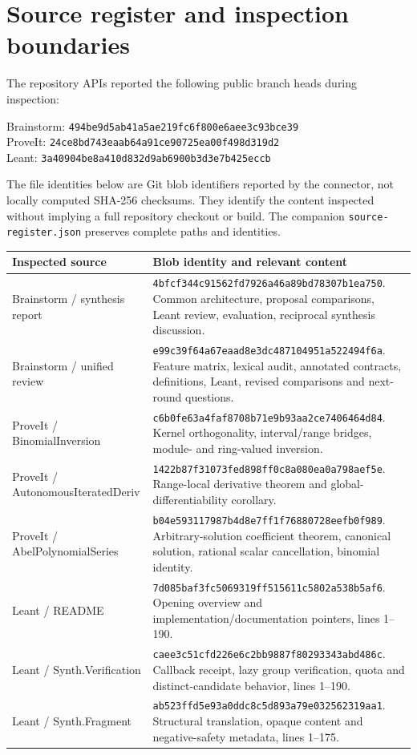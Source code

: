 \documentclass[11pt,a4paper]{article}
\newcommand{\code}[1]{\nolinkurl{#1}}
\theoremstyle{definition}
\begin{document}
\section{Source register and inspection boundaries}
\label{app:sources}
The repository APIs reported the following public branch heads during inspection:
\begin{flushleft}\small
Brainstorm: \code{494be9d5ab41a5ae219fc6f800e6aee3c93bce39}\\
ProveIt: \code{24ce8bd743eaab64a91ce90725ea00f498d319d2}\\
Leant: \code{3a40904be8a410d832d9ab6900b3d3e7b425eccb}
\end{flushleft}
The file identities below are Git blob identifiers reported by the connector,
not locally computed SHA-256 checksums. They identify the content inspected
without implying a full repository checkout or build. The companion
\code{source-register.json} preserves complete paths and identities.

\begin{longtable}{@{}P{.37\textwidth}P{.55\textwidth}@{}}
\toprule
Inspected source & Blob identity and relevant content \\
\midrule
\endhead
Brainstorm / synthesis report & \code{4bfcf344c91562fd7926a46a89bd78307b1ea750}. Common architecture, proposal comparisons, Leant review, evaluation, reciprocal synthesis discussion. \\
Brainstorm / unified review & \code{e99c39f64a67eaad8e3dc487104951a522494f6a}. Feature matrix, lexical audit, annotated contracts, definitions, Leant, revised comparisons and next-round questions. \\
ProveIt / BinomialInversion & \code{c6b0fe63a4faf8708b71e9b93aa2ce7406464d84}. Kernel orthogonality, interval/range bridges, module- and ring-valued inversion. \\
ProveIt / AutonomousIteratedDeriv & \code{1422b87f31073fed898ff0c8a080ea0a798aef5e}. Range-local derivative theorem and global-differentiability corollary. \\
ProveIt / AbelPolynomialSeries & \code{b04e593117987b4d8e7ff1f76880728eefb0f989}. Arbitrary-solution coefficient theorem, canonical solution, rational scalar cancellation, binomial identity. \\
Leant / README & \code{7d085baf3fc5069319ff515611c5802a538b5af6}. Opening overview and implementation/documentation pointers, lines 1--190. \\
Leant / Synth.Verification & \code{caee3c51cfd226e6c2bb9887f80293343abd486c}. Callback receipt, lazy group verification, quota and distinct-candidate behavior, lines 1--190. \\
Leant / Synth.Fragment & \code{ab523ffd5e93a0ddc8c5d893a79e032562319aa1}. Structural translation, opaque content and negative-safety metadata, lines 1--175. \\
\bottomrule
\end{longtable}
\end{document}
